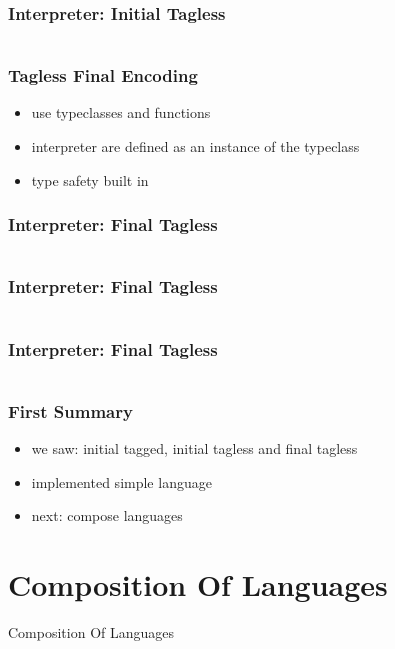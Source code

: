 \documentclass[aspectratio=169, hyperref={colorlinks, linkcolor=beamer@centricgreen}, urlcolor=links]{beamer}
\begin{document}
\begin{frame}[fragile]
  \frametitle{Interpreter: Initial Tagless}
  \inputminted[fontsize=\footnotesize]{scala}{snippets/initial-tagless-add.scala}
\end{frame}

\begin{frame}
  \frametitle{Tagless Final Encoding}
  \begin{itemize}
  \item use typeclasses and functions
  \item interpreter are defined as an instance of the typeclass
  \item type safety built in
  \end{itemize}
\end{frame}

\begin{frame}[fragile]
  \frametitle{Interpreter: Final Tagless}
  \inputminted[fontsize=\footnotesize]{scala}{snippets/final-tagless-expr.scala}
\end{frame}

\begin{frame}[fragile]
  \frametitle{Interpreter: Final Tagless}
  \inputminted[fontsize=\footnotesize]{scala}{snippets/final-tagless-sample.scala}
\end{frame}

\begin{frame}[fragile]
  \frametitle{Interpreter: Final Tagless}
  \inputminted[fontsize=\footnotesize]{scala}{snippets/final-tagless-interp.scala}
\end{frame}

\begin{frame}
  \frametitle{First Summary}
  \begin{itemize}
  \item we saw: initial tagged, initial tagless and final tagless
  \item implemented simple language
  \item next: compose languages
  \end{itemize}
\end{frame}

\section{Composition Of Languages}\label{sec:composition-languages}

\begin{frame}
  \begin{center}
    \Huge
    Composition Of Languages
  \end{center}
\end{frame}
\end{document}
